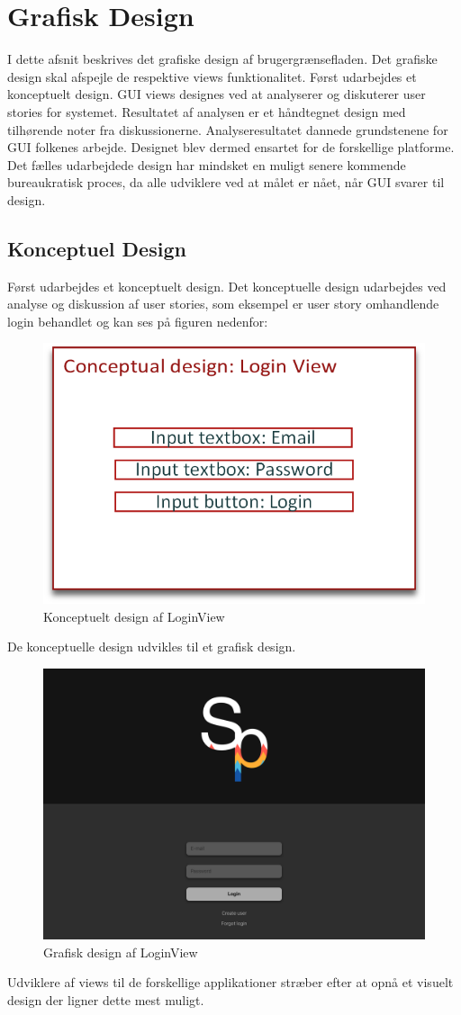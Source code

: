 
\section{Grafisk Design}
I dette afsnit beskrives det grafiske design af brugergrænsefladen. Det grafiske design skal afspejle de respektive views funktionalitet. Først udarbejdes et konceptuelt design. GUI views designes ved at analyserer og diskuterer user stories for systemet. Resultatet af analysen er et håndtegnet design med tilhørende noter fra diskussionerne. Analyseresultatet dannede grundstenene for GUI folkenes arbejde. Designet blev dermed ensartet for de forskellige platforme. Det fælles udarbejdede design har mindsket en muligt senere kommende bureaukratisk proces, da alle udviklere ved at målet er nået, når GUI svarer til design. 

\subsection{Konceptuel Design}
Først udarbejdes et konceptuelt design. Det konceptuelle design udarbejdes ved analyse og diskussion af user stories, som eksempel er user story omhandlende login behandlet og kan ses på figuren nedenfor:

\begin{figure}
	\centering
	\includegraphics[width=0.5\linewidth]{figs/design/concuptuel_design_loginview}
	\caption{Konceptuelt design af LoginView}
	\label{fig:conceptualdesignview}
\end{figure}

De konceptuelle design udvikles til et grafisk design.

\begin{figure}
	\centering
	\includegraphics[width=0.5\linewidth]{figs/design/DesktopHDLogin}
	\caption{Grafisk design af LoginView}
	\label{fig:graphicaldesign}
\end{figure}
Udviklere af views til de forskellige applikationer stræber efter at opnå et visuelt design der ligner dette mest muligt.